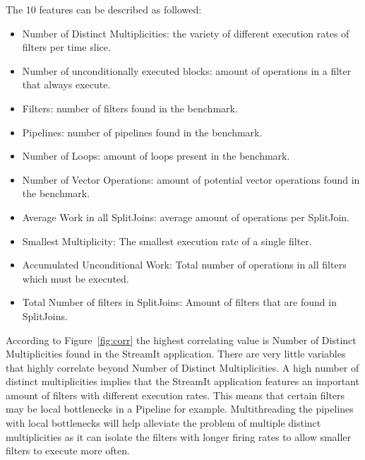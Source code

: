 The 10 features can be described as followed:
\begin{itemize}
\item Number of Distinct Multiplicities: the variety of different execution rates of filters per time slice.
\vspace{-0.5em}
\item Number of unconditionally executed blocks: amount of operations in a filter that always execute.
\vspace{-0.5em}
\item Filters: number of filters found in the benchmark.
\vspace{-0.5em}
\item Pipelines: number of pipelines found in the benchmark.
\vspace{-0.5em}
\item Number of Loops: amount of loops present in the benchmark.
\vspace{-0.5em}
\item Number of Vector Operations: amount of potential vector operations found in the benchmark.
\vspace{-0.5em}
\item Average Work in all SplitJoins: average amount of operations per SplitJoin.
\vspace{-0.5em}
\item Smallest Multiplicity: The smallest execution rate of a single filter.
\vspace{-0.5em}
\item Accumulated Unconditional Work: Total number of operations in all filters which must be executed.
\vspace{-0.5em}
\item Total Number of filters in SplitJoins: Amount of filters that are found in SplitJoins.
\end{itemize}

According to Figure~\ref{fig:corr} the highest correlating value is Number of Distinct Multiplicities found in the StreamIt application.
There are very little variables that highly correlate beyond Number of Distinct Multiplicities.
A high number of distinct multiplicities implies that the StreamIt application features an important amount of filters with different execution rates.
This means that certain filters may be local bottlenecks in a Pipeline for example.
Multithreading the pipelines with local bottlenecks will help alleviate the problem of multiple distinct multiplicities as it can isolate the filters with longer firing rates to allow smaller filters to execute more often.

